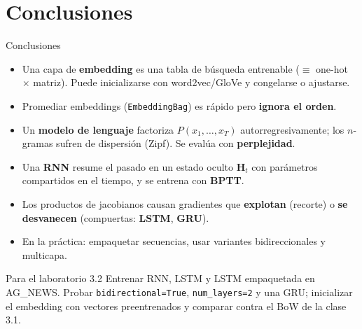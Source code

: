\documentclass[aspectratio=169, 10pt]{beamer}
\begin{document}
\section{Conclusiones}

\begin{frame}{Conclusiones}

	\begin{itemize}
		\item Una capa de \textbf{embedding} es una tabla de b\'usqueda entrenable ($\equiv$ one-hot $\times$ matriz). Puede inicializarse con word2vec/GloVe y congelarse o ajustarse.

		\vspace{0.12cm}

		\item Promediar embeddings (\texttt{EmbeddingBag}) es r\'apido pero \textbf{ignora el orden}.

		\vspace{0.12cm}

		\item Un \textbf{modelo de lenguaje} factoriza $P(x_1,\ldots,x_T)$ autorregresivamente; los $n$-gramas sufren de dispersi\'on (Zipf). Se eval\'ua con \textbf{perplejidad}.

		\vspace{0.12cm}

		\item Una \textbf{RNN} resume el pasado en un estado oculto $\mathbf{H}_t$ con par\'ametros compartidos en el tiempo, y se entrena con \textbf{BPTT}.

		\vspace{0.12cm}

		\item Los productos de jacobianos causan gradientes que \textbf{explotan} (recorte) o \textbf{se desvanecen} (compuertas: \textbf{LSTM}, \textbf{GRU}).

		\vspace{0.12cm}

		\item En la pr\'actica: empaquetar secuencias, usar variantes bidireccionales y multicapa.
	\end{itemize}

	\vspace{0.15cm}

	\begin{alertblock}{Para el laboratorio 3.2}
		Entrenar RNN, LSTM y LSTM empaquetada en AG\_NEWS. Probar \texttt{bidirectional=True}, \texttt{num\_layers=2} y una GRU; inicializar el embedding con vectores preentrenados y comparar contra el BoW de la clase 3.1.
	\end{alertblock}

\end{frame}
\end{document}
